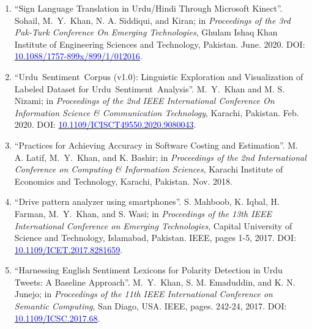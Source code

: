 \documentclass[a4paper, 10pt]{article}
\begin{document}
\begin{enumerate}
\item ``Sign Language Translation in Urdu/Hindi Through Microsoft Kinect''. Sohail, \textcolor{NavyBlue}{M.~Y.~Khan}, N. A. Siddiqui, and Kiran; in \emph{Proceedings of the 3rd Pak-Turk Conference On Emerging Technologies}, Ghulam Ishaq Khan Institute of Engineering Sciences and Technology, Pakistan. June. 2020. DOI: \href{https://dpi.org/10.1088/1757-899x/899/1/012016}{\textcolor{blue}{10.1088/1757-899x/899/1/012016}}.

\item ``Urdu~Sentiment~Corpus (v1.0): Linguistic Exploration and Visualization of Labeled Dataset for Urdu~Sentiment~Analysis''. \textcolor{NavyBlue}{M.~Y.~Khan} and M. S. Nizami; in \emph{Proceedings of the 2nd IEEE International Conference On Information Science \& Communication Technology}, Karachi, Pakistan. Feb. 2020. DOI: \href{https://doi.org/10.1109/ICISCT49550.2020.9080043}{\textcolor{blue}{10.1109/ICISCT49550.2020.9080043}}.

 
  
  \item ``Practices for Achieving Accuracy in Software Costing and Estimation''. M. A. Latif, \textcolor{NavyBlue}{M.~Y.~Khan}, and K. Bashir; in \emph{Proceedings of the 2nd International Conference on Computing \& Information Sciences}, Karachi Institute of Economics and Technology, Karachi, Pakistan. Nov. 2018.
  
  \item ``Drive pattern analyzer using smartphones''. S. Mahboob, K. Iqbal, H. Farman, \textcolor{NavyBlue}{M.~Y.~Khan}, and S. Wasi; in \emph{ Proceedings of the 13th IEEE International Conference on Emerging Technologies}, Capital University of Science and Technology, Islamabad, Pakistan. IEEE, pages 1-5, 2017. DOI: \href{https://doi.org/10.1109/ICET.2017.8281659}{\textcolor{blue}{10.1109/ICET.2017.8281659}}.
  
  \item ``Harnessing English Sentiment Lexicons for Polarity Detection in Urdu Tweets: A Baseline Approach''. \textcolor{NavyBlue}{M.~Y.~Khan}, S. M. Emaduddin, and K. N. Junejo;  in \emph{Proceedings of the 11th IEEE International Conference on Semantic Computing}, San Diago, USA. IEEE, pages. 242-24, 2017. DOI: \href{https://doi.org/10.1109/ICSC.2017.68}{\textcolor{blue}{10.1109/ICSC.2017.68}}.
\end{enumerate}
\end{document}
